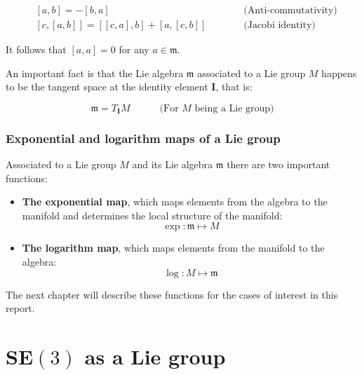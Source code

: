\documentclass[a4paper,11pt]{report}
\begin{document}
\begin{eqnarray}
 & [a,b] = -[b,a]   & \quad\quad\quad \text{(Anti-commutativity)} \\
 & \left[ c, \left[a,b \right] \right] =
\left[ \left[c,a\right] , b \right] +
\left[ a,\left[c,b\right] \right]  &  \quad\quad\quad \text{(Jacobi identity)}
\end{eqnarray}

It follows that $[a,a]=0$ for any $a \in \mathfrak{m}$.

An important fact is that the Lie algebra $\mathfrak{m}$
associated to a Lie group $M$ happens to be the tangent
space at the identity element $\mathbf{I}$, that is:

\begin{equation}
 \mathfrak{m} = T_\mathbf{I} M   \quad\quad\quad\text{(For $M$ being a Lie group)}
\end{equation}



\subsection{Exponential and logarithm maps of a Lie group}
\label{sect:exp_ln}

Associated to a Lie group $M$ and its
Lie algebra $\mathfrak{m}$ there are
two important functions:

\begin{itemize}
\item{\textbf{The exponential map}, which maps elements from
the algebra to the manifold and determines the local structure
of the manifold:
\begin{equation}
 \exp: \mathfrak{m}  \mapsto M
\end{equation}
}
\item{\textbf{The logarithm map}, which maps elements from
the manifold to the algebra:
\begin{equation}
 \log: M  \mapsto \mathfrak{m}
\end{equation}
}
\end{itemize}

The next chapter will describe these functions for
the cases of interest in this report.



\chapter{$\mathbf{SE}(3)$ as a Lie group}
\label{chap:se3_lie}
\end{document}
